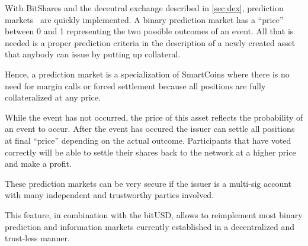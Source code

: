 With BitShares and the decentral exchange described in \cref{sec:dex},
prediction markets~\cite{wiki_pm} are quickly implemented. A binary prediction
market has a ``price'' between 0 and 1 representing the two possible outcomes
of an event. All that is needed is a proper prediction criteria in the
description of a newly created asset that anybody can issue by putting up
collateral. 

Hence, a prediction market is a specialization of SmartCoins where there is no
need for margin calls or forced settlement because all positions are fully
collateralized at any price. 

While the event has not occurred, the price of this asset reflects the
probability of an event to occur. After the event has occured the issuer can
settle all positions at final ``price'' depending on the actual outcome.
Participants that have voted correctly will be able to settle their shares back
to the network at a higher price and make a profit.

These prediction markets can be very secure if the issuer is a multi-sig
account with many independent and trustworthy parties involved.

This feature, in combination with the bitUSD, allows to reimplement most binary
prediction and information markets currently established in a decentralized and
trust-less manner.
